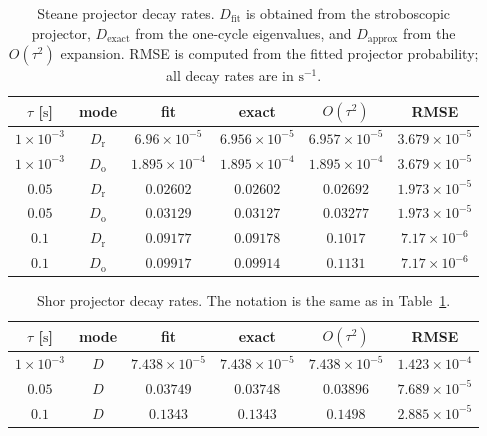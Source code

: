 \begin{table}[h]
    \centering
    \caption{Steane projector decay rates. $D_{\mathrm{fit}}$ is obtained from
    the stroboscopic projector, $D_{\mathrm{exact}}$ from the one-cycle
    eigenvalues, and $D_{\mathrm{approx}}$ from the $O(\tau^2)$ expansion.
    RMSE is computed from the fitted projector probability; all decay rates are in $\mathrm{s}^{-1}$.}
    \label{tab:projector-decay-rates-steane}
    \begin{tabular}{|c|c|c|c|c|c|}
        \hline
        $\tau$ [$\mathrm{s}$] & mode & fit & exact & $O(\tau^2)$ & RMSE \\
        \hline
        $1\times10^{-3}$ & $D_{\mathrm r}$ & $6.96\times10^{-5}$ & $6.956\times10^{-5}$ & $6.957\times10^{-5}$ & $3.679\times10^{-5}$ \\
        $1\times10^{-3}$ & $D_{\mathrm o}$ & $1.895\times10^{-4}$ & $1.895\times10^{-4}$ & $1.895\times10^{-4}$ & $3.679\times10^{-5}$ \\
        $0.05$ & $D_{\mathrm r}$ & $0.02602$ & $0.02602$ & $0.02692$ & $1.973\times10^{-5}$ \\
        $0.05$ & $D_{\mathrm o}$ & $0.03129$ & $0.03127$ & $0.03277$ & $1.973\times10^{-5}$ \\
        $0.1$ & $D_{\mathrm r}$ & $0.09177$ & $0.09178$ & $0.1017$ & $7.17\times10^{-6}$ \\
        $0.1$ & $D_{\mathrm o}$ & $0.09917$ & $0.09914$ & $0.1131$ & $7.17\times10^{-6}$ \\
        \hline
    \end{tabular}
\end{table}

\begin{table}[h]
    \centering
    \caption{Shor projector decay rates. The notation is the same as in
    Table~\ref{tab:projector-decay-rates-steane}.}
    \label{tab:projector-decay-rates-shor}
    \begin{tabular}{|c|c|c|c|c|c|}
        \hline
        $\tau$ [$\mathrm{s}$] & mode & fit & exact & $O(\tau^2)$ & RMSE \\
        \hline
        $1\times10^{-3}$ & $D$ & $7.438\times10^{-5}$ & $7.438\times10^{-5}$ & $7.438\times10^{-5}$ & $1.423\times10^{-4}$ \\
        $0.05$ & $D$ & $0.03749$ & $0.03748$ & $0.03896$ & $7.689\times10^{-5}$ \\
        $0.1$ & $D$ & $0.1343$ & $0.1343$ & $0.1498$ & $2.885\times10^{-5}$ \\
        \hline
    \end{tabular}
\end{table}
